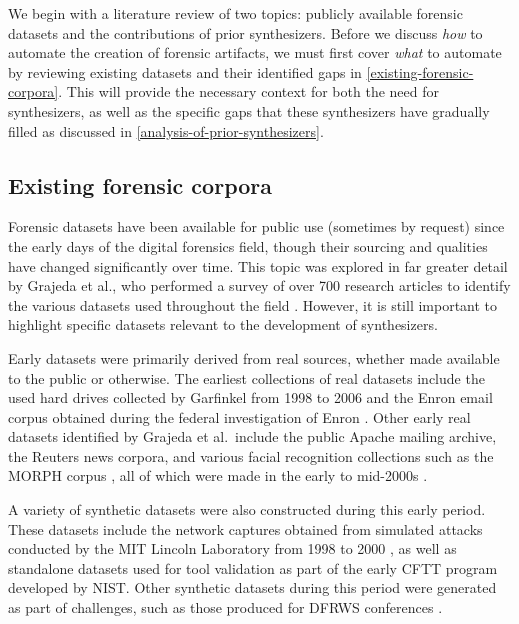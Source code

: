We begin with a literature review of two topics: publicly available
forensic datasets and the contributions of prior synthesizers. Before we
discuss \emph{how} to automate the creation of forensic artifacts, we
must first cover \emph{what} to automate by reviewing existing datasets
and their identified gaps in \autoref{existing-forensic-corpora}.
This will provide the necessary context for both the need for
synthesizers, as well as the specific gaps that these synthesizers have
gradually filled as discussed in \autoref{analysis-of-prior-synthesizers}.

\subsection{Existing forensic
corpora}\label{existing-forensic-corpora}

Forensic datasets have been available for public use (sometimes by
request) since the early days of the digital forensics field, though
their sourcing and qualities have changed significantly over time. This
topic was explored in far greater detail by Grajeda et al., who
performed a survey of over 700 research articles to identify the various
datasets used throughout the field
\cite{grajedaAvailabilityDatasetsDigital2017}. However, it is still
important to highlight specific datasets relevant to the development of
synthesizers.

Early datasets were primarily derived from real sources, whether made
available to the public or otherwise. The earliest collections of real
datasets include the used hard drives collected by Garfinkel from 1998
to 2006 and the Enron email corpus obtained during the federal
investigation of Enron \cite{garfinkelForensicCorporaChallenge2007}.
Other early real datasets identified by Grajeda et al.~include the
public Apache mailing archive, the Reuters news corpora, and various
facial recognition collections such as the MORPH corpus
\cite{ricanekMORPHLongitudinalImage2006}, all of which were made in
the early to mid-2000s
\cite{yannikosDataCorporaDigital2014,grajedaAvailabilityDatasetsDigital2017}.

A variety of synthetic datasets were also constructed during this early
period. These datasets include the network captures obtained from
simulated attacks conducted by the MIT Lincoln Laboratory from 1998 to
2000 \cite{garfinkelForensicCorporaChallenge2007}, as well as
standalone datasets used for tool validation as part of the early CFTT
program developed by NIST. Other synthetic datasets during this period
were generated as part of challenges, such as those produced for DFRWS
conferences \cite{woodsCreatingRealisticCorpora2011}.

